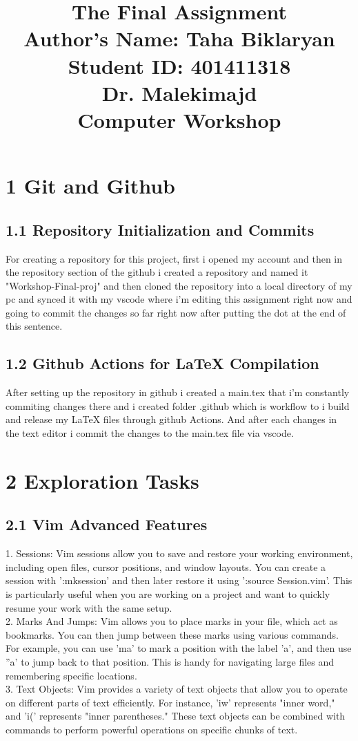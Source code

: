\documentclass{article}
\title{\Huge The Final Assignment \\[1cm]
\Large Author's Name: Taha Biklaryan \\[0.5cm]
\large Student ID: 401411318 \\[1cm]  
\large Dr. Malekimajd \\[1cm]
\large Computer Workshop}
\date{} %
\begin{document}
\maketitle
\newpage
\section*{\Huge 1 Git and Github}
\subsection*{\Large 1.1 Repository Initialization and Commits}
For creating a repository for this project, first i opened my account and then in the repository section of the github i created a repository and named it "Workshop-Final-proj" and then 
cloned the repository into a local directory of my pc and synced it with my vscode where i'm editing this assignment right now and going to commit the changes so far right now after putting the dot
at the end of this sentence.\\
\subsection*{\Large 1.2 Github Actions for LaTeX Compilation}
After setting up the repository in github i created a main.tex that i'm constantly commiting changes there
and i created folder .github which is workflow to i build and release my LaTeX files through github Actions.
And after each changes in the text editor i commit the changes to the main.tex file via vscode.\\


\section*{\Huge 2 Exploration Tasks}
\subsection*{\Large 2.1 Vim Advanced Features}
1. Sessions:
Vim sessions allow you to save and restore your working environment, including open files, cursor positions, and window layouts. You can create a session with ':mksession' and then later restore it using ':source Session.vim'. This is particularly useful when you are working on a project and want to quickly resume your work with the same setup.\\
2. Marks And Jumps:
Vim allows you to place marks in your file, which act as bookmarks. You can then jump between these marks using various commands. For example, you can use 'ma' to mark a position with the label 'a', and then use ''a' to jump back to that position. This is handy for navigating large files and remembering specific locations.\\
3. Text Objects:
Vim provides a variety of text objects that allow you to operate on different parts of text efficiently. For instance, 'iw' represents "inner word," and 'i(' represents "inner parentheses." These text objects can be combined with commands to perform powerful operations on specific chunks of text.\\
\end{document}
